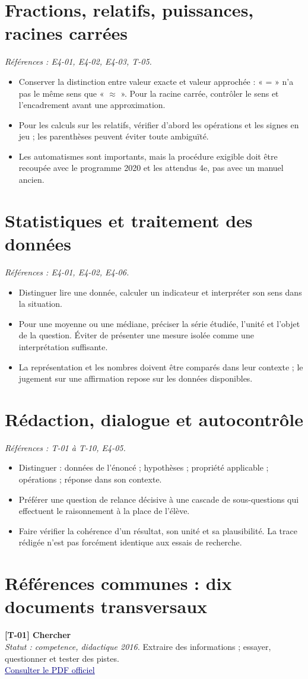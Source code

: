 \documentclass[11pt,a4paper]{article}
\newcommand{\refsource}[1]{\textsf{\textcolor{slate}{[#1]}}}
\newcommand{\sectionref}[2]{\section{#1}\textit{Références : #2.}\par}
\newcommand{\entreesource}[5]{\par\noindent\textbf{\refsource{#1} #2}\\[-2pt]\textit{Statut : #3.} #4\\[-2pt]\href{#5}{\textcolor{navy}{\underline{Consulter le PDF officiel}}}\par\smallskip}
\begin{document}
\sectionref{Fractions, relatifs, puissances, racines carrées}{E4-01, E4-02, E4-03, T-05}
\begin{itemize}
\item Conserver la distinction entre valeur exacte et valeur approchée : « = » n’a pas le même sens que «  $\approx$  ». Pour la racine carrée, contrôler le sens et l’encadrement avant une approximation.
\item Pour les calculs sur les relatifs, vérifier d’abord les opérations et les signes en jeu ; les parenthèses peuvent éviter toute ambiguïté.
\item Les automatismes sont importants, mais la procédure exigible doit être recoupée avec le programme 2020 et les attendus 4e, pas avec un manuel ancien.
\end{itemize}
\sectionref{Statistiques et traitement des données}{E4-01, E4-02, E4-06}
\begin{itemize}
\item Distinguer lire une donnée, calculer un indicateur et interpréter son sens dans la situation.
\item Pour une moyenne ou une médiane, préciser la série étudiée, l’unité et l’objet de la question. Éviter de présenter une mesure isolée comme une interprétation suffisante.
\item La représentation et les nombres doivent être comparés dans leur contexte ; le jugement sur une affirmation repose sur les données disponibles.
\end{itemize}
\sectionref{Rédaction, dialogue et autocontrôle}{T-01 à T-10, E4-05}
\begin{itemize}
\item Distinguer : données de l’énoncé ; hypothèses ; propriété applicable ; opérations ; réponse dans son contexte.
\item Préférer une question de relance décisive à une cascade de sous-questions qui effectuent le raisonnement à la place de l’élève.
\item Faire vérifier la cohérence d’un résultat, son unité et sa plausibilité. La trace rédigée n’est pas forcément identique aux essais de recherche.
\end{itemize}
\section{Références communes : dix documents transversaux}
\entreesource{T-01}{Chercher}{competence, didactique 2016}{Extraire des informations ; essayer, questionner et tester des pistes.}{https://eduscol.education.gouv.fr/sites/default/files/document/ra16c4mathchercher552125pdf-77583.pdf}
\end{document}
